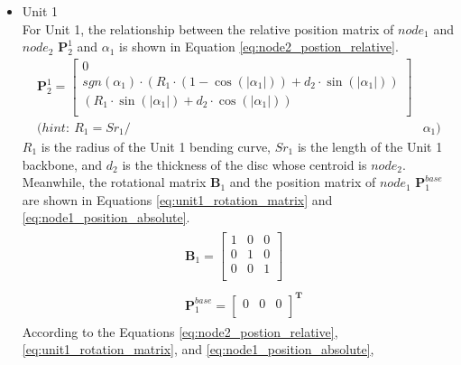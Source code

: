 \begin{itemize}
    \item Unit 1 \\
    For Unit 1, the relationship between the relative position matrix of $node_1$ and $node_2$ $\textbf{P}_{2}^{1}$ and 
    $\alpha_1$ is shown in Equation \ref{eq:node2_postion_relative}.
    \begin{align}
        \textbf{P}_{2}^{1} = 
        \begin{bmatrix}
            0 \\
            sgn(\alpha_1)\cdot(R_1\cdot(1-\cos(\left|\alpha_1\right|)) + d_2\cdot \sin(\left|\alpha_1\right|)) \\
            (R_1\cdot \sin(\left|\alpha_1\right|) + d_2\cdot \cos(\left|\alpha_1\right|)) \\
        \end{bmatrix}&
        \label{eq:node2_postion_relative} \\
        \nonumber (hint: \ R_1 = {Sr}_1/ &\alpha_1)
    \end{align}
    $R_1$ is the radius of the Unit 1 bending curve, ${Sr}_1$ is the length of the Unit 1 backbone, and $d_2$ is the thickness 
    of the disc whose centroid is $node_2$. Meanwhile, the rotational matrix $\textbf{B}_{1}$ and the position matrix of 
    $node_1$ $\textbf{P}_{1}^{base}$ are shown in Equations \ref*{eq:unit1_rotation_matrix} and \ref{eq:node1_position_absolute}.
    \begin{align}
        &\begin{aligned}
            \textbf{B}_{1} = 
            \begin{bmatrix}
                1 & 0 & 0 \\
                0 & 1 & 0 \\
                0 & 0 & 1 \\
            \end{bmatrix}
        \end{aligned}
        \label{eq:unit1_rotation_matrix} \\
        &\begin{aligned}
            \textbf{P}_{1}^{base} = 
            \begin{bmatrix}
                0 & 0 & 0\\
            \end{bmatrix}^{\textbf{T}}
        \end{aligned}
        \label{eq:node1_position_absolute}
    \end{align}
    According to the Equations \ref{eq:node2_postion_relative}, \ref*{eq:unit1_rotation_matrix}, and \ref{eq:node1_position_absolute}, 

\end{itemize}
